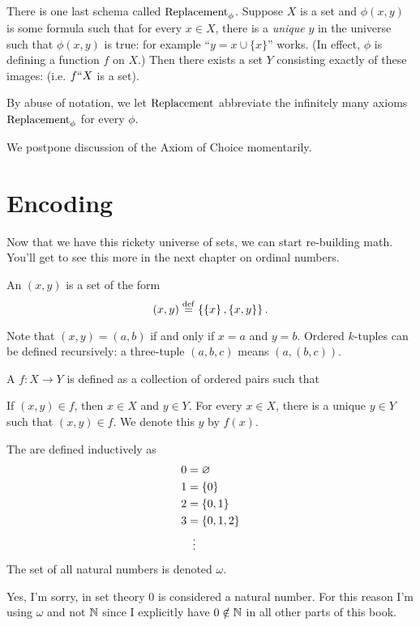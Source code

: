 There is one last schema called $\mathrm{Replacement}_\phi$.
Suppose $X$ is a set and $\phi(x,y)$ is some formula
such that for every $x \in X$, there is a \emph{unique} $y$ in the universe
such that $\phi(x,y)$ is true: for example ``$y = x \cup \{x\}$'' works.
(In effect, $\phi$ is defining a function $f$ on $X$.)
Then there exists a set $Y$ consisting exactly of these images:
(i.e. $f``X$ is a set).
\begin{abuse}
	By abuse of notation, we let $\mathrm{Replacement}$ abbreviate
	the infinitely many axioms $\mathrm{Replacement}_\phi$ for every $\phi$.
\end{abuse}

We postpone discussion of the Axiom of Choice momentarily.

\section{Encoding}
Now that we have this rickety universe of sets, we can start re-building math.
You'll get to see this more in the next chapter on ordinal numbers.

\begin{definition}
	An  $(x,y)$
	is a set of the form
	\[ (x,y) \overset{\mathrm{def}}{=} 
		\left\{ \left\{ x \right\}, \left\{ x,y \right\} \right\}. \]
\end{definition}
Note that $(x,y) = (a,b)$ if and only if $x=a$ and $y=b$.
Ordered $k$-tuples can be defined recursively: a three-tuple $(a,b,c)$ means $(a,(b,c))$.

\begin{definition}
	A  $f : X \to Y$
	is defined as a collection of ordered pairs such that
	\begin{itemize}
		\ii If $(x,y) \in f$, then $x \in X$ and $y \in Y$.
		\ii For every $x \in X$, there is a unique $y \in Y$
		such that $(x,y) \in f$. We denote this $y$ by $f(x)$.
	\end{itemize}
\end{definition}

\begin{definition}
	The  are defined inductively as
	\begin{align*}
		0 &= \varnothing \\
		1 &= \{0\} \\
		2 &= \{0,1\} \\
		3 &= \{0,1,2\} \\
		&\vdotswithin=
	\end{align*}
	The set of all natural numbers is denoted $\omega$.
\end{definition}
\begin{abuse}
	Yes, I'm sorry, in set theory $0$ is considered a natural number.
	For this reason I'm using $\omega$ and not $\mathbb N$
	since I explicitly have $0\notin\mathbb N$ in all other parts of this book.
\end{abuse}

